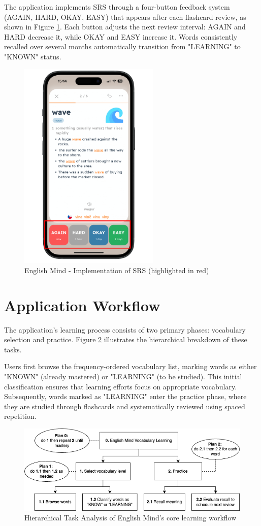 The application implements SRS through a four-button feedback system (AGAIN, HARD, OKAY, EASY) that appears after each flashcard review, as shown in Figure \ref{fig:em-srs-flashcard}. Each button adjusts the next review interval: AGAIN and HARD decrease it, while OKAY and EASY increase it. Words consistently recalled over several months automatically transition from "LEARNING" to "KNOWN" status.

\begin{figure}[!h]
    \includegraphics[width=0.6\textwidth]{src/figures/em-srs-flashcard.png}
    \caption{English Mind - Implementation of SRS (highlighted in red)}
    \label{fig:em-srs-flashcard}
\end{figure}

\section{Application Workflow}

The application's learning process consists of two primary phases: vocabulary selection and practice. Figure \ref{fig:em-hta} illustrates the hierarchical breakdown of these tasks.

Users first browse the frequency-ordered vocabulary list, marking words as either "KNOWN" (already mastered) or "LEARNING" (to be studied). This initial classification ensures that learning efforts focus on appropriate vocabulary. Subsequently, words marked as "LEARNING" enter the practice phase, where they are studied through flashcards and systematically reviewed using spaced repetition.

\vspace{1cm}

\begin{figure}[!h]
    \includegraphics[width=1\textwidth]{src/figures/english_mind_workflow_THA.png}
    \caption{Hierarchical Task Analysis of English Mind's core learning workflow}
    \label{fig:em-hta}
\end{figure}
